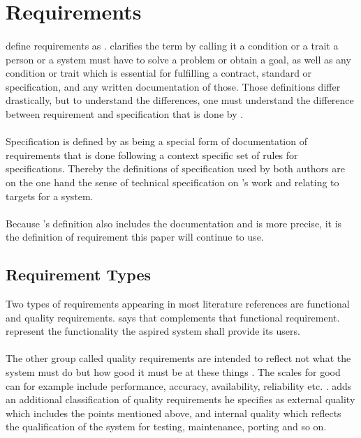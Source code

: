 \section{Requirements}
\paragraph{} \textcite[4]{Sommerville.2000} define requirements as . \textcite[13]{Pohl.2007} clarifies the term by calling it a condition or a trait a person or a system must have to solve a problem or obtain a goal, as well as any condition or trait which is essential for fulfilling a contract, standard or specification, and any written documentation of those. Those definitions differ drastically, but to understand the differences, one must understand the difference between requirement and specification that is done by \citeauthor{Pohl.2007}.
\paragraph{} Specification is defined by \textcite[220]{Pohl.2007} as being a special form of documentation of requirements that is done following a context specific set of rules for specifications. Thereby the definitions of specification used by both authors are on the one hand the sense of technical specification on \citeauthor{Pohl.2007}'s work and \citeauthor{Sommerville.2000} relating to targets for a system. 
\paragraph{} Because \citeauthor{Pohl.2007}'s definition also includes the documentation and is more precise, it is the definition of requirement this paper will continue to use.
\subsection{Requirement Types}
Two types of requirements appearing in most literature references are functional and quality requirements. \textcite[14]{Lauesen.2008} says that  \textcite[cf.][15]{Pohl.2007} complements that functional requirement. represent the functionality the aspired system shall provide its users. 
\paragraph{} The other group called quality requirements are intended to reflect not what the system must do but how good it must be at these things \parencite[cf.][15]{Lauesen.2008}. The scales for good can for example include performance, accuracy, availability, reliability etc. \parencite[cf.][15]{Pohl.2007}. \textcite[cf.][29]{Ebert.2014} adds an additional classification of quality requirements he specifies as external quality which includes the points mentioned above, and internal quality which reflects the qualification of the system for testing, maintenance, porting and so on.
